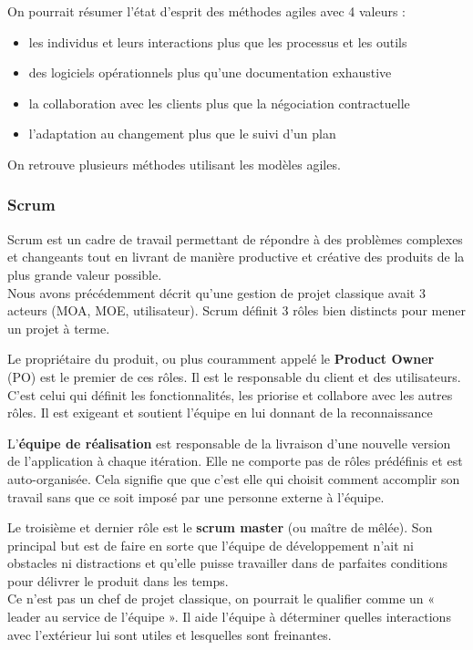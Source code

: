 \documentclass[12pt]{report}
\begin{document}
On pourrait résumer l'état d'esprit des méthodes agiles avec 4 valeurs :
\begin{itemize}
\item les individus et leurs interactions plus que les processus et les outils
\item des logiciels opérationnels plus qu'une documentation exhaustive
\item la collaboration avec les clients plus que la négociation contractuelle
\item l'adaptation au changement plus que le suivi d'un plan
\end{itemize}
On retrouve plusieurs méthodes utilisant les modèles agiles.

\subsubsection{Scrum}

Scrum est un cadre de travail permettant de répondre à des problèmes complexes et changeants tout en livrant de manière productive et créative des produits de la plus grande valeur possible.~~\\
Nous avons précédemment décrit qu'une gestion de projet classique avait 3 acteurs (MOA, MOE, utilisateur). Scrum définit 3 rôles bien distincts pour mener un projet à terme.

Le propriétaire du produit, ou plus couramment appelé le \textbf{Product Owner} (PO) est le premier de ces rôles. Il est le responsable du client et des utilisateurs. C'est celui qui définit les fonctionnalités, les priorise et collabore avec les autres rôles. Il est exigeant et soutient l'équipe en lui donnant de la reconnaissance

L'\textbf{équipe de réalisation} est responsable de la livraison d'une nouvelle version de l'application à chaque itération. Elle ne comporte pas de rôles prédéfinis et est auto-organisée. Cela signifie que que c'est elle qui choisit comment accomplir son travail sans que ce soit imposé par une personne externe à l'équipe.

Le troisième et dernier rôle est le \textbf{scrum master} (ou maître de mêlée). Son principal but est de faire en sorte que l'équipe de développement n'ait ni obstacles ni distractions et qu'elle puisse travailler dans de parfaites conditions pour délivrer le produit dans les temps.~~\\
Ce n'est pas un chef de projet classique, on pourrait le qualifier comme un « leader au service de l'équipe ». Il aide l'équipe à déterminer quelles interactions avec l'extérieur lui sont utiles et lesquelles sont freinantes.
\end{document}
